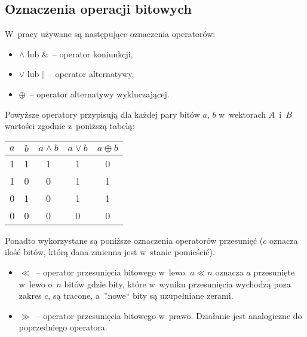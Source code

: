 \begin{appendices}
\section{Oznaczenia operacji bitowych}
\label{app:bitwise_operations}

    W~pracy używane są następujące oznaczenia operatorów:

    \begin{itemize}
        \item $\land$ lub $\&$~-- operator koniunkcji,
        \item $\lor$ lub $|$~-- operator alternatywy,
        \item $\oplus$~-- operator alternatywy wykluczającej.
    \end{itemize}

    \noindent Powyższe operatory przypisują dla każdej pary bitów $a$, $b$
    w~wektorach $A$~i~$B$ wartości zgodnie z~poniższą tabelą:

    \begin{center}
        \begin{tabular}{ |c|c||c|c|c| }
            \hline
            $a$ & $b$ & $a \land b$ & $a \lor b$ & $a \oplus b$ \\
            \hline
            1 & 1 & 1 & 1 & 0 \\
            1 & 0 & 0 & 1 & 1 \\
            0 & 1 & 0 & 1 & 1 \\
            0 & 0 & 0 & 0 & 0 \\
            \hline
        \end{tabular}
    \end{center}

    \noindent Ponadto wykorzystane są poniższe oznaczenia operatorów przesunięć
    ($c$ oznacza ilość bitów, którą dana zmienna jest w~stanie pomieścić).

    \begin{itemize}

        \item $\ll$~-- operator przesunięcia bitowego w~lewo. $a \ll n$ oznacza
        $a$ przesunięte w~lewo o~$n$ bitów gdzie bity, które w~wyniku
        przesunięcia wychodzą poza zakres $c$, są tracone, a~''nowe`` bity są
        uzupełniane zerami.

        \item $\gg$~-- operator przesunięcia bitowego w~prawo. Działanie jest
        analogiczne do poprzedniego operatora.


\end{itemize}
\end{appendices}
